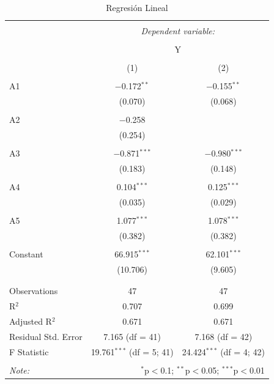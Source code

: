 \documentclass[10pt,a4paper]{article}\usepackage[]{graphicx}\usepackage[]{color}
\begin{document}
\begin{table}[!htbp] \centering 
  \caption{Regresión Lineal} 
  \label{} 
\begin{tabular}{@{\extracolsep{5pt}}lcc} 
\\[-1.8ex]\hline 
\hline \\[-1.8ex] 
 & \multicolumn{2}{c}{\textit{Dependent variable:}} \\ 
\cline{2-3} 
\\[-1.8ex] & \multicolumn{2}{c}{Y} \\ 
\\[-1.8ex] & (1) & (2)\\ 
\hline \\[-1.8ex] 
 A1 & $-$0.172$^{**}$ & $-$0.155$^{**}$ \\ 
  & (0.070) & (0.068) \\ 
  & & \\ 
 A2 & $-$0.258 &  \\ 
  & (0.254) &  \\ 
  & & \\ 
 A3 & $-$0.871$^{***}$ & $-$0.980$^{***}$ \\ 
  & (0.183) & (0.148) \\ 
  & & \\ 
 A4 & 0.104$^{***}$ & 0.125$^{***}$ \\ 
  & (0.035) & (0.029) \\ 
  & & \\ 
 A5 & 1.077$^{***}$ & 1.078$^{***}$ \\ 
  & (0.382) & (0.382) \\ 
  & & \\ 
 Constant & 66.915$^{***}$ & 62.101$^{***}$ \\ 
  & (10.706) & (9.605) \\ 
  & & \\ 
\hline \\[-1.8ex] 
Observations & 47 & 47 \\ 
R$^{2}$ & 0.707 & 0.699 \\ 
Adjusted R$^{2}$ & 0.671 & 0.671 \\ 
Residual Std. Error & 7.165 (df = 41) & 7.168 (df = 42) \\ 
F Statistic & 19.761$^{***}$ (df = 5; 41) & 24.424$^{***}$ (df = 4; 42) \\ 
\hline 
\hline \\[-1.8ex] 
\textit{Note:}  & \multicolumn{2}{r}{$^{*}$p$<$0.1; $^{**}$p$<$0.05; $^{***}$p$<$0.01} \\ 
\end{tabular} 
\end{table} 
\end{document}
